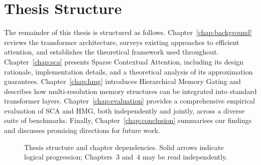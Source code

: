 \section{Thesis Structure}

The remainder of this thesis is structured as follows.
Chapter~\ref{chap:background} reviews the transformer architecture, surveys existing
approaches to efficient attention, and establishes the theoretical framework used throughout.
Chapter~\ref{chap:sca} presents Sparse Contextual Attention, including its design rationale,
implementation details, and a theoretical analysis of its approximation guarantees.
Chapter~\ref{chap:hmg} introduces Hierarchical Memory Gating and describes how multi-resolution
memory structures can be integrated into standard transformer layers.
Chapter~\ref{chap:evaluation} provides a comprehensive empirical evaluation of SCA and HMG,
both independently and jointly, across a diverse suite of benchmarks. Finally,
Chapter~\ref{chap:conclusion} summarises our findings and discusses promising directions for
future work.

\begin{figure}[htbp]
  \centering
  \caption{Thesis structure and chapter dependencies. Solid arrows indicate logical
    progression; Chapters~3 and~4 may be read independently.}
  \label{fig:thesis-structure}
\end{figure}

